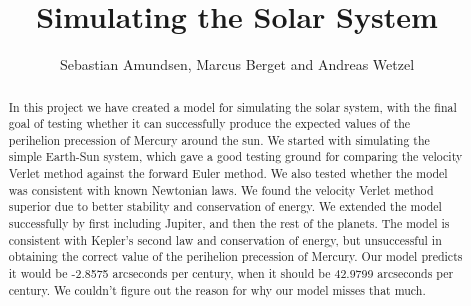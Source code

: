 \documentclass{article}
\begin{document}
\title{Simulating the Solar System}
\author{Sebastian Amundsen, Marcus Berget and Andreas Wetzel}

\maketitle

\begin{abstract}
In this project we have created a model for simulating the solar system, with the final goal of testing whether it can successfully produce the expected values of the perihelion precession of Mercury around the sun. We started with simulating the simple Earth-Sun system, which gave a good testing ground for comparing the velocity Verlet method against the forward Euler method. We also tested whether the model was consistent with known Newtonian laws. We found the velocity Verlet method superior due to better stability and conservation of energy. We extended the model successfully by first including Jupiter, and then the rest of the planets. The model is consistent with Kepler's second law and conservation of energy, but unsuccessful in obtaining the correct value of the perihelion precession of Mercury. Our model predicts it would be -2.8575 arcseconds per century,  when it should be 42.9799 arcseconds per century. We couldn't figure out the reason for why our model misses that much.
\end{abstract}
\end{document}
